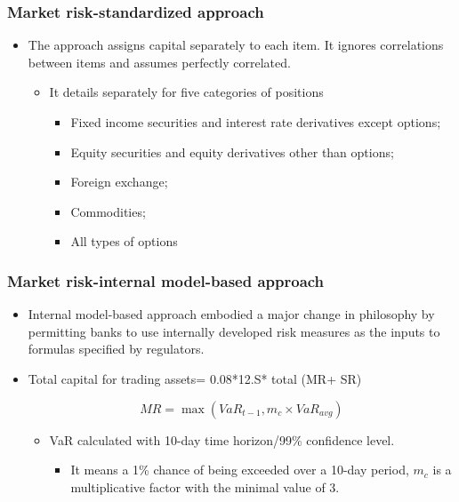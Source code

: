 \subsubsection{Market risk-standardized approach}
\begin{itemize}
\item The approach assigns capital separately to each item. It ignores correlations between items and assumes perfectly correlated.
    \begin{itemize}
    \item It details separately for five categories of positions
        \begin{itemize}
        \item Fixed income securities and interest rate derivatives except options;
        \item Equity securities and equity derivatives other than options;
        \item Foreign exchange;
        \item Commodities;
        \item All types of options
        \end{itemize}
    \end{itemize}
\end{itemize}


\subsubsection{Market risk-internal model-based approach}
\begin{itemize}
\item Internal model-based approach embodied a major change in philosophy by permitting banks to use internally developed risk measures as the inputs to formulas specified by regulators.
\item Total capital for trading assets= 0.08*12.S* total (MR+ SR)

    \begin{equation}
    MR = \max\left(VaR_{t-1}, m_c \times VaR_{avg}\right)
    \end{equation}
    \begin{itemize}
    \item VaR calculated with 10-day time horizon/99\% confidence level.
        \begin{itemize}
        \item It means a 1\% chance of being exceeded over a 10-day period, $m_c$ is a multiplicative factor with the minimal value of 3.
        \end{itemize}
    \end{itemize}
\end{itemize}



